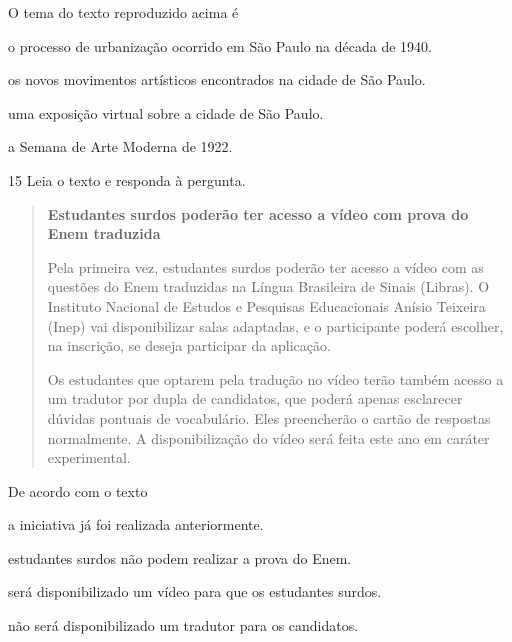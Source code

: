 
O tema do texto reproduzido acima é

\begin{escolha}
  \item o processo de urbanização ocorrido em São Paulo na década de 1940.

  \item os novos movimentos artísticos encontrados na cidade de São Paulo.

  \item uma exposição virtual sobre a cidade de São Paulo.

  \item a Semana de Arte Moderna de 1922.
\end{escolha}

\num{15} Leia o texto e responda à pergunta.

\begin{quote}
\textbf{Estudantes surdos poderão ter acesso a vídeo com prova do Enem
traduzida}

Pela primeira vez, estudantes surdos poderão ter acesso a vídeo com as
questões do Enem traduzidas na Língua Brasileira de Sinais (Libras). O
Instituto Nacional de Estudos e Pesquisas Educacionais Anísio Teixeira
(Inep) vai disponibilizar salas adaptadas, e o participante poderá
escolher, na inscrição, se deseja participar da aplicação.

Os estudantes que optarem pela tradução no vídeo terão também acesso a
um tradutor por dupla de candidatos, que poderá apenas esclarecer
dúvidas pontuais de vocabulário. Eles preencherão o cartão de respostas
normalmente. A disponibilização do vídeo será feita este ano em caráter
experimental.
\end{quote}


De acordo com o texto

\begin{escolha}
  \item a iniciativa já foi realizada anteriormente.

  \item estudantes surdos não podem realizar a prova do Enem.

  \item será disponibilizado um vídeo para que os estudantes surdos.

  \item não será disponibilizado um tradutor para os candidatos.
\end{escolha}



